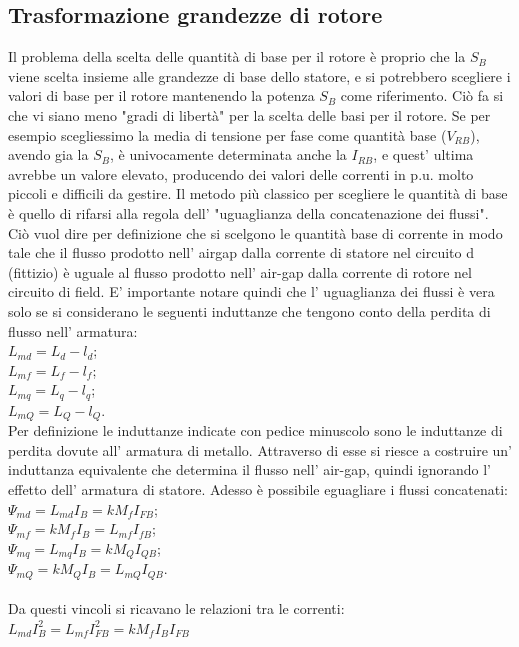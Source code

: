 \documentclass[Lau,noexaminfo]{sapthesis}
\begin{document}
	 \subsection{Trasformazione grandezze di rotore}
	 Il problema della scelta delle quantità di base per il rotore è proprio che la $S_B$ viene scelta insieme alle grandezze di base dello statore, e si potrebbero scegliere i valori di base per il rotore mantenendo la potenza $S_B$ come riferimento. Ciò fa si che vi siano meno "gradi di libertà" per la scelta delle basi per il rotore. Se per esempio scegliessimo la media di tensione per fase come quantità base ($V_{RB}$), avendo gia la $S_B$, è univocamente determinata anche la $I_{RB}$, e quest' ultima avrebbe un valore elevato, producendo dei valori delle correnti in p.u. molto piccoli e difficili da gestire. Il metodo più classico per scegliere le quantità di base è quello di rifarsi alla regola dell' "uguaglianza della concatenazione dei flussi". Ciò vuol dire per definizione che si scelgono le quantità base di corrente in modo tale che il flusso prodotto nell' airgap dalla corrente di statore nel circuito d (fittizio) è uguale al flusso prodotto nell' air-gap dalla corrente di rotore nel circuito di field. E' importante notare quindi che l' uguaglianza dei flussi è vera solo se si considerano le seguenti induttanze che tengono conto della perdita di flusso nell' armatura:\\
	 $L_{md}=L_d-l_d$;\\
	 $L_{mf}=L_f-l_f$;\\
	 $L_{mq}=L_q-l_q$;\\
	 $L_{mQ}=L_Q-l_Q$.\\
	 Per definizione le induttanze indicate con pedice minuscolo sono le induttanze di perdita dovute all' armatura di metallo. Attraverso di esse si riesce a costruire un' induttanza equivalente che determina il flusso nell' air-gap, quindi ignorando l' effetto dell' armatura di statore. Adesso è possibile eguagliare i flussi concatenati:\\
	 $\Psi_{md}=L_{md}I_B=kM_f I_{FB}$;\\
	 $\Psi_{mf}=kM_fI_B=L_{mf}I_{fB}$;\\
	 $\Psi_{mq}=L_{mq}I_B=kM_QI_{QB}$;\\
	 $\Psi_{mQ}=kM_Q I_B=L_{mQ}I_{QB}$.\\\\
	 Da questi vincoli si ricavano le relazioni tra le correnti:\\
	 $L_{md} I_B^2=L_{mf}I_{FB}^2=kM_fI_BI_{FB}$\\
\end{document}
